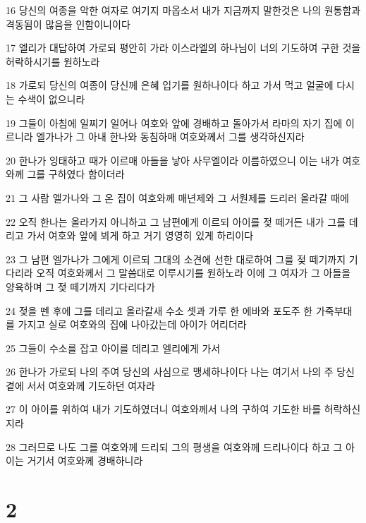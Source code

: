 \par 16 당신의 여종을 악한 여자로 여기지 마옵소서 내가 지금까지 말한것은 나의 원통함과 격동됨이 많음을 인함이니이다
\par 17 엘리가 대답하여 가로되 평안히 가라 이스라엘의 하나님이 너의 기도하여 구한 것을 허락하시기를 원하노라
\par 18 가로되 당신의 여종이 당신께 은혜 입기를 원하나이다 하고 가서 먹고 얼굴에 다시는 수색이 없으니라
\par 19 그들이 아침에 일찌기 일어나 여호와 앞에 경배하고 돌아가서 라마의 자기 집에 이르니라 엘가나가 그 아내 한나와 동침하매 여호와께서 그를 생각하신지라
\par 20 한나가 잉태하고 때가 이르매 아들을 낳아 사무엘이라 이름하였으니 이는 내가 여호와께 그를 구하였다 함이더라
\par 21 그 사람 엘가나와 그 온 집이 여호와께 매년제와 그 서원제를 드리러 올라갈 때에
\par 22 오직 한나는 올라가지 아니하고 그 남편에게 이르되 아이를 젖 떼거든 내가 그를 데리고 가서 여호와 앞에 뵈게 하고 거기 영영히 있게 하리이다
\par 23 그 남편 엘가나가 그에게 이르되 그대의 소견에 선한 대로하여 그를 젖 떼기까지 기다리라 오직 여호와께서 그 말씀대로 이루시기를 원하노라 이에 그 여자가 그 아들을 양육하며 그 젖 떼기까지 기다리다가
\par 24 젖을 뗀 후에 그를 데리고 올라갈새 수소 셋과 가루 한 에바와 포도주 한 가죽부대를 가지고 실로 여호와의 집에 나아갔는데 아이가 어리더라
\par 25 그들이 수소를 잡고 아이를 데리고 엘리에게 가서
\par 26 한나가 가로되 나의 주여 당신의 사심으로 맹세하나이다 나는 여기서 나의 주 당신 곁에 서서 여호와께 기도하던 여자라
\par 27 이 아이를 위하여 내가 기도하였더니 여호와께서 나의 구하여 기도한 바를 허락하신지라
\par 28 그러므로 나도 그를 여호와께 드리되 그의 평생을 여호와께 드리나이다 하고 그 아이는 거기서 여호와께 경배하니라

\chapter{2}

